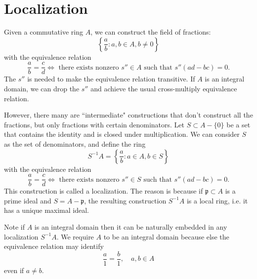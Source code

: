 \section{Localization}
Given a commutative ring $A$, we can construct the field of fractions:
\[
    \left\{ \frac{a}{b} : a, b \in A, b \neq 0\right\}
\]
with the equivalence relation
\[
    \frac{a}{b} = \frac{c}{d} \iff \text{ there exists nonzero $s'' \in A$ such that } s''(ad - bc) = 0.
\]
The $s''$ is needed to make the equivalence relation transitive. If $A$ is an integral domain, we can drop the $s''$ and achieve the usual cross-multiply equivalence relation.

However, there many are ``intermediate" constructions that don't construct all the fractions, but only fractions with certain denominators. Let $S \subset A - \{0\}$ be a set that contains the identity and is closed under multiplication. We can consider $S$ as the set of denominators, and define the ring
\[
    S^{-1}A = \left\{ \frac{a}{b} : a \in A, b \in S \right\}
\]
with the equivalence relation
\[
    \frac{a}{b} = \frac{c}{d} \iff \text{ there exists nonzero $s'' \in S$ such that } s''(ad - bc) = 0.
\]
This construction is called a localization. The reason is because if $\mathfrak p \subset A$ is a prime ideal and $S = A - \mathfrak p$, the resulting construction $S^{-1}A$ is a local ring, i.e. it has a unique maximal ideal.

Note if $A$ is an integral domain then it can be naturally embedded in any localization $S^{-1}A$. We require $A$ to be an integral domain because else the equivalence relation may identify
\[
    \frac{a}{1} = \frac{b}{1}, \quad a,b \in A
\]
even if $a \neq b$.
